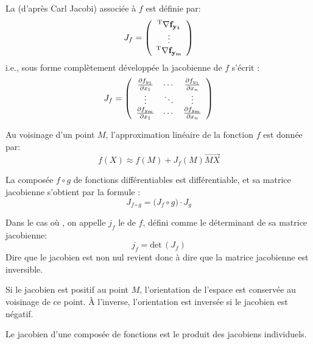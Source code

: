 \medskip
La  (d'après Carl Jacobi) 
associée à $f$ est définie par:
\begin{equation}
J_f = \left( \begin{array}{c} {}^\mathrm{T}\mathbf{\nabla f_{y_1}} \\ \vdots \\ {}^\mathrm{T}\mathbf{\nabla f_{y_m}} \end{array}\right)
\end{equation}
i.e., sous forme complètement développée la jacobienne de $f$ s'écrit :
\begin{equation}
J_f = \left( \begin{array}{ccc} \frac{\partial f_{y_1}}{\partial x_1} & \cdots & \frac{\partial f_{y_1}}{\partial x_n} \\ \vdots & \ddots & \vdots \\ \frac{\partial f_{y_m}}{\partial x_1} & \cdots & \frac{\partial f_{y_m}}{\partial x_n} \end{array}\right)
\end{equation}

\medskip
Au voisinage d'un point $M$, l'approximation linéaire de la fonction $f$ est donnée par:
\begin{equation} f\left(X\right) \approx f\left(M\right) + J_f\left(M\right) \overrightarrow{MX}\end{equation}

\medskip
La composée $f\circ g$ de fonctions différentiables est différentiable, et sa matrice jacobienne 
s'obtient par la formule :
\begin{equation} J_{f \circ g}= \bigl( J_f \circ g \bigr) \cdot J_g\end{equation}

\bigskip
Dans le cas où , on appelle $j_f$ le  de $f$, 
défini comme le déterminant de sa matrice jacobienne: 
\begin{equation} j_f = \mathrm{det}\, \left(J_f \right) \end{equation}
Dire que le jacobien est non nul revient donc à dire que la matrice jacobienne est inversible.


\medskip
Si le jacobien est positif au point $M$, l'orientation de l'espace est conservée au voisinage de ce point. 
À l'inverse, l'orientation est inversée si le jacobien est négatif.

\medskip
Le jacobien d'une composée de fonctions est le produit des jacobiens individuels.

